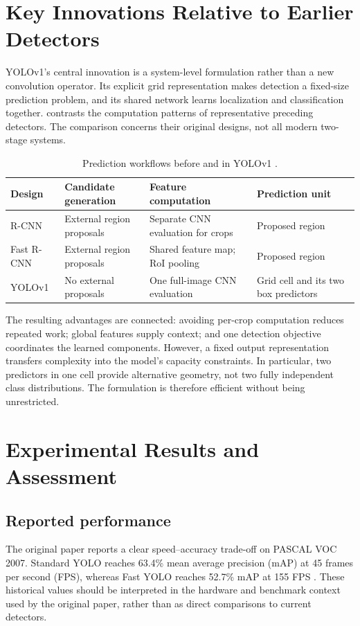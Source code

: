 \documentclass[11pt,a4paper]{article}
\begin{document}
\FloatBarrier
\section{Key Innovations Relative to Earlier Detectors}
\label{sec:innovations}
YOLOv1's central innovation is a system-level formulation rather than a new convolution operator. Its explicit grid representation makes detection a fixed-size prediction problem, and its shared network learns localization and classification together.  contrasts the computation patterns of representative preceding detectors. The comparison concerns their original designs, not all modern two-stage systems.

\begin{table}[!htbp]
\centering\small
\caption{Prediction workflows before and in YOLOv1 \cite{rcnn2014,fastrcnn2015,redmon2016yolo}.}
\label{tab:previous}
\begin{tabularx}{\linewidth}{@{}lXXX@{}}
\toprule
Design & Candidate generation & Feature computation & Prediction unit \\
\midrule
R-CNN & External region proposals & Separate CNN evaluation for crops & Proposed region \\
Fast R-CNN & External region proposals & Shared feature map; RoI pooling & Proposed region \\
YOLOv1 & No external proposals & One full-image CNN evaluation & Grid cell and its two box predictors \\
\bottomrule
\end{tabularx}
\end{table}

The resulting advantages are connected: avoiding per-crop computation reduces repeated work; global features supply context; and one detection objective coordinates the learned components. However, a fixed output representation transfers complexity into the model's capacity constraints. In particular, two predictors in one cell provide alternative geometry, not two fully independent class distributions. The formulation is therefore efficient without being unrestricted.

\section{Experimental Results and Assessment}
\label{sec:assessment}
\subsection{Reported performance}
The original paper reports a clear speed--accuracy trade-off on PASCAL VOC 2007. Standard YOLO reaches 63.4\% mean average precision (mAP) at 45 frames per second (FPS), whereas Fast YOLO reaches 52.7\% mAP at 155 FPS \cite{redmon2016yolo}. These historical values should be interpreted in the hardware and benchmark context used by the original paper, rather than as direct comparisons to current detectors.
\end{document}
